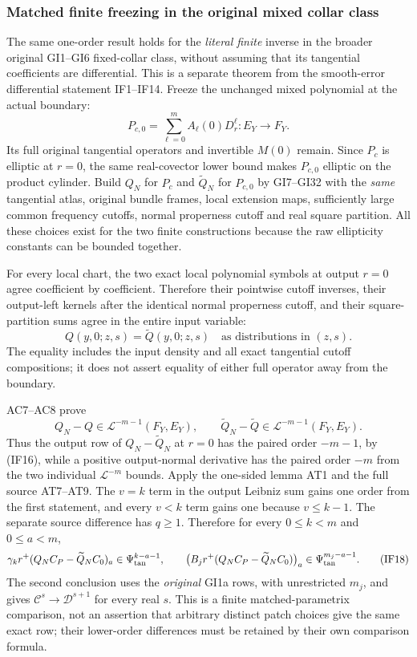 \documentclass[
  11pt,
]{article}
\begin{document}
\subsubsection{Matched finite freezing in the original mixed collar
class}\label{matched-finite-freezing-in-the-original-mixed-collar-class}

The same one-order result holds for the \emph{literal finite} inverse in
the broader original GI1--GI6 fixed-collar class, without assuming that
its tangential coefficients are differential. This is a separate theorem
from the smooth-error differential statement IF1--IF14. Freeze the
unchanged mixed polynomial at the actual boundary: \[
 P_{c,0}=\sum_{\ell=0}^m A_\ell(0)D_r^\ell:E_Y\to F_Y .
 \tag{IF15}
\] Its full original tangential operators and invertible \(M(0)\)
remain. Since \(P_c\) is elliptic at \(r=0\), the same real-covector
lower bound makes \(P_{c,0}\) elliptic on the product cylinder. Build
\(Q_N\) for \(P_c\) and \(\widetilde Q_N\) for \(P_{c,0}\) by GI7--GI32
with the \emph{same} tangential atlas, original bundle frames, local
extension maps, sufficiently large common frequency cutoffs, normal
properness cutoff and real square partition. All these choices exist for
the two finite constructions because the raw ellipticity constants can
be bounded together.

For every local chart, the two exact local polynomial symbols at output
\(r=0\) agree coefficient by coefficient. Therefore their pointwise
cutoff inverses, their output-left kernels after the identical normal
properness cutoff, and their square-partition sums agree in the entire
input variable: \[
 Q(y,0;z,s)=\widetilde Q(y,0;z,s)
 \quad\text{as distributions in }(z,s).
 \tag{IF16}
\] The equality includes the input density and all exact tangential
cutoff compositions; it does not assert equality of either full operator
away from the boundary.

AC7--AC8 prove \[
 Q_N-Q\in\mathcal L^{-m-1}(F_Y,E_Y),\qquad
 \widetilde Q_N-\widetilde Q\in\mathcal L^{-m-1}(F_Y,E_Y).
 \tag{IF17}
\] Thus the output row of \(Q_N-\widetilde Q_N\) at \(r=0\) has the
paired order \(-m-1\), by (IF16), while a positive output-normal
derivative has the paired order \(-m\) from the two individual
\(\mathcal L^{-m}\) bounds. Apply the one-sided lemma AT1 and the full
source AT7--AT9. The \(v=k\) term in the output Leibniz sum gains one
order from the first statement, and every \(v<k\) term gains one because
\(v\leq k-1\). The separate source difference has \(q\geq1\). Therefore
for every \(0\leq k<m\) and \(0\leq a<m\), \[
 \gamma_k r^+(Q_NC_P-\widetilde Q_NC_0)_a
 \in\Psi_{\rm tan}^{k-a-1},\qquad
 \bigl(B_jr^+(Q_NC_P-\widetilde Q_NC_0)\bigr)_a
 \in\Psi_{\rm tan}^{m_j-a-1}.
 \tag{IF18}
\] The second conclusion uses the \emph{original} GI1a rows, with
unrestricted \(m_j\), and gives \(\mathcal C^s\to\mathcal D^{s+1}\) for
every real \(s\). This is a finite matched-parametrix comparison, not an
assertion that arbitrary distinct patch choices give the same exact row;
their lower-order differences must be retained by their own comparison
formula.
\end{document}
